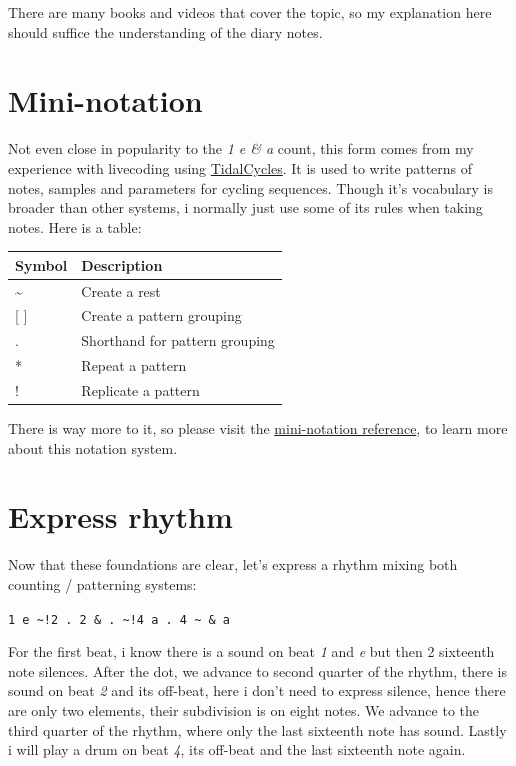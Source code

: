 \documentclass[
]{book}
\begin{document}
There are many books and videos that cover the topic, so my explanation here should suffice the understanding of the diary notes.

\hypertarget{mini-notation}{%
\section*{Mini-notation}\label{mini-notation}}

Not even close in popularity to the \emph{1 e \& a} count, this form comes from my experience with livecoding using \href{https://tidalcycles.org/}{TidalCycles}. It is used to write patterns of notes, samples and parameters for cycling sequences. Though it's vocabulary is broader than other systems, i normally just use some of its rules when taking notes. Here is a table:

\begin{longtable}[]{@{}ll@{}}
\toprule
Symbol & Description \\
\midrule
\endhead
\textasciitilde{} & Create a rest \\
{[} {]} & Create a pattern grouping \\
. & Shorthand for pattern grouping \\
* & Repeat a pattern \\
! & Replicate a pattern \\
\bottomrule
\end{longtable}

There is way more to it, so please visit the \href{https://tidalcycles.org/docs/reference/mini_notation}{mini-notation reference}, to learn more about this notation system.

\hypertarget{express-rhythm}{%
\section*{Express rhythm}\label{express-rhythm}}

Now that these foundations are clear, let's express a rhythm mixing both counting / patterning systems:

\texttt{1\ e\ \textasciitilde{}!2\ .\ 2\ \&\ .\ \textasciitilde{}!4\ a\ .\ 4\ \textasciitilde{}\ \&\ a}

For the first beat, i know there is a sound on beat \emph{1} and \emph{e} but then 2 sixteenth note silences. After the dot, we advance to second quarter of the rhythm, there is sound on beat \emph{2} and its off-beat, here i don't need to express silence, hence there are only two elements, their subdivision is on eight notes. We advance to the third quarter of the rhythm, where only the last sixteenth note has sound. Lastly i will play a drum on beat \emph{4}, its off-beat and the last sixteenth note again.
\end{document}
